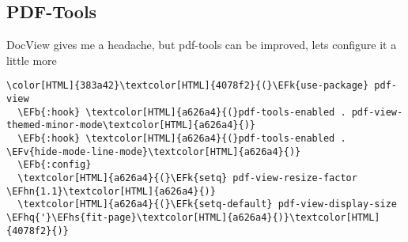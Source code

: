 \documentclass{scrartcl}
\newcommand{\EFk}[1]{\textcolor{EFk}{#1}} %
\newcommand{\EFb}[1]{\textcolor{EFb}{#1}} %
\newcommand{\EFv}[1]{\textcolor{EFv}{#1}} %
\newcommand{\EFhn}[1]{\textcolor{EFhn}{\textbf{#1}}} %
\newcommand{\EFhq}[1]{\textcolor{EFhq}{#1}} %
\newcommand{\EFhs}[1]{\textcolor{EFhs}{#1}} %
\begin{document}
\subsection{PDF-Tools}
\label{sec:org97b9029}
DocView gives me a headache, but pdf-tools can be improved, lets configure it a little more
\begin{Code}
\begin{Verbatim}[]
\color[HTML]{383a42}\textcolor[HTML]{4078f2}{(}\EFk{use-package} pdf-view
  \EFb{:hook} \textcolor[HTML]{a626a4}{(}pdf-tools-enabled . pdf-view-themed-minor-mode\textcolor[HTML]{a626a4}{)}
  \EFb{:hook} \textcolor[HTML]{a626a4}{(}pdf-tools-enabled . \EFv{hide-mode-line-mode}\textcolor[HTML]{a626a4}{)}
  \EFb{:config}
  \textcolor[HTML]{a626a4}{(}\EFk{setq} pdf-view-resize-factor \EFhn{1.1}\textcolor[HTML]{a626a4}{)}
  \textcolor[HTML]{a626a4}{(}\EFk{setq-default} pdf-view-display-size \EFhq{'}\EFhs{fit-page}\textcolor[HTML]{a626a4}{)}\textcolor[HTML]{4078f2}{)}
\end{Verbatim}
\end{Code}
\end{document}

